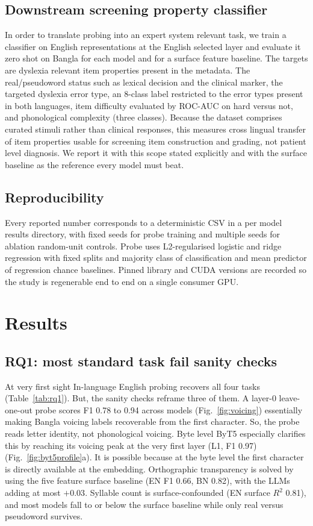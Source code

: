 \documentclass[preprint,12pt]{elsarticle}
\begin{document}
\subsection{Downstream screening property classifier}
\label{sec:method-downstream}
In order to translate probing into an expert system relevant task, we train a classifier on English representations at the English selected layer and evaluate it zero shot on Bangla for each model and for a surface feature baseline. The targets are dyslexia relevant item properties present in the metadata. The real/pseudoword status such as lexical decision and the clinical marker, the targeted dyslexia error type, an 8-class label restricted to the error types present in both languages, item difficulty evaluated by ROC-AUC on hard versus not, and phonological complexity (three classes). Because the dataset comprises curated stimuli rather than clinical responses, this measures cross lingual transfer of item properties usable for screening item construction and grading, not patient level diagnosis. We report it with this scope stated explicitly and with the surface baseline as the reference every model must beat.

\subsection{Reproducibility}
Every reported number corresponds to a deterministic CSV in a per model results directory, with fixed seeds for probe training and multiple seeds for ablation random-unit controls. Probe uses L2-regularised logistic and ridge regression with fixed splits and majority class of classification and mean predictor of regression chance baselines. Pinned library and CUDA versions are recorded so the study is regenerable end to end on a single consumer GPU.

\section{Results}
\label{sec:results}

\subsection{RQ1: most standard task fail sanity checks}
At very first sight In-language English probing recovers all four tasks (Table~\ref{tab:rq1}). But, the sanity checks reframe three of them. A layer-0 leave-one-out probe scores F1 0.78 to 0.94 across models (Fig.~\ref{fig:voicing}) essentially making Bangla voicing labels recoverable from the first character. So, the probe reads letter identity, not phonological voicing. Byte level ByT5 especially clarifies this by reaching its voicing peak at the very first layer (L1, F1 0.97) (Fig.~\ref{fig:byt5profile}a). It is possible because at the byte level the first character is directly available at the embedding. Orthographic transparency is solved by using the five feature surface baseline (EN F1 0.66, BN 0.82), with the LLMs adding at most $+0.03$. Syllable count is surface-confounded (EN surface $R^2$ 0.81), and most models fall to or below the surface baseline while only real versus pseudoword survives.
\end{document}
